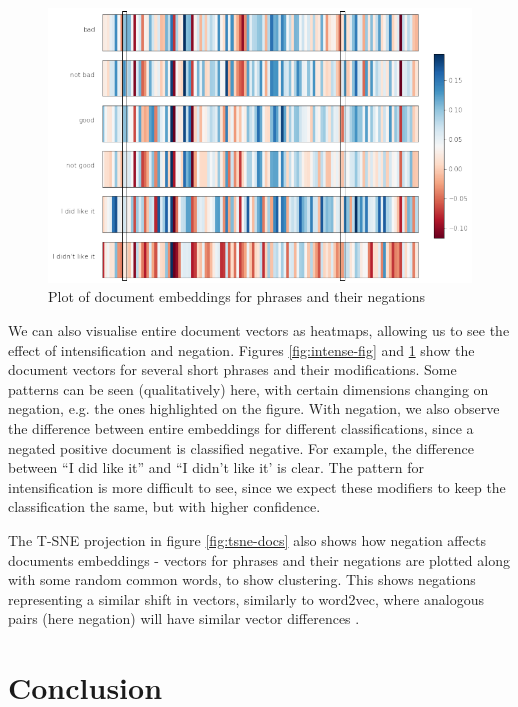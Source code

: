 \documentclass[a4paper]{article}
\begin{document}
\begin{multicols}{2}
\begin{figure}
  \centering
  \includegraphics[width=\textwidth,height=\textheight,keepaspectratio]{figs/negate1.png}
  \caption{Plot of document embeddings for phrases and their negations}
  \label{fig:negate-fig}
\end{figure}


We can also visualise entire document vectors as heatmaps, allowing us to see the effect of intensification and negation. Figures \ref{fig:intense-fig} and \ref{fig:negate-fig} show the document vectors for several short phrases and their modifications. Some patterns can be seen (qualitatively) here, with certain dimensions changing on negation, e.g. the ones highlighted on the figure. With negation, we also observe the difference between entire embeddings for different classifications, since a negated positive document is classified negative. For example, the difference between ``I did like it'' and ``I didn't like it' is clear. The pattern for intensification is more difficult to see, since we expect these modifiers to keep the classification the same, but with higher confidence.



The T-SNE projection in figure \ref{fig:tsne-docs} also shows how negation affects documents embeddings - vectors for phrases and their negations are plotted along with some random common words, to show clustering. This shows negations representing a similar shift in vectors, similarly to word2vec, where analogous pairs (here negation) will have similar vector differences \cite{DBLP:journals/corr/ChenPG17}.


\section{Conclusion}


\end{multicols}
\end{document}
